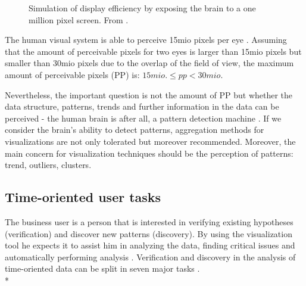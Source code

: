 \begin{figure}[H]
    \centering
    \caption[Display Efficiency]{Simulation of display efficiency by exposing the brain to a one million pixel screen. From  \cite{Ware2012}.}
    \label{fig:DE}
\end{figure}

The human visual system is able to perceive 15mio pixels per eye  \cite{Deering1998}. Assuming that the amount of perceivable pixels for two eyes is larger than 15mio pixels but smaller than 30mio pixels due to the overlap of the field of view, the maximum amount of perceivable pixels (\gls{PP}) is:
\begin{math}
15 mio. \leq pp < 30 mio.
\end{math}

Nevertheless, the important question is not the amount of \gls{PP} but whether the data structure, patterns, trends and further information in the data can be perceived - the human brain is after all, a pattern detection machine  \cite{Ware2012}. If we consider the brain's ability to detect patterns, aggregation methods for visualizations are not only tolerated but moreover recommended. Moreover, the main concern for visualization techniques should be the perception of patterns: trend, outliers, clusters. \label{pattern}
\par

\subsection{Time-oriented user tasks} \label{tasks}
The business user is a person that is interested in verifying existing hypotheses (verification) and discover new patterns (discovery). By using the visualization tool he expects it to assist him in analyzing the data, finding critical issues and automatically performing analysis \cite{Brachman1996}. Verification and discovery in the analysis of time-oriented data can be split in seven major tasks  \cite{Esling2012}.\\*

